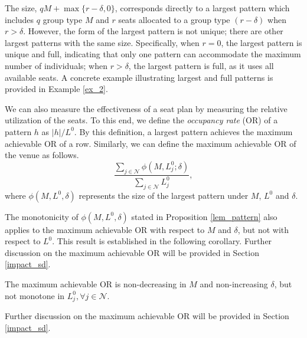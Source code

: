 The size, $qM + \max\{r-\delta, 0\}$, corresponds directly to a largest pattern which includes $q$ group type $M$ and $r$ seats allocated to a group type $(r-\delta)$ when $r>\delta$. However, the form of the largest pattern is not unique; there are other largest patterns with the same size. 
Specifically, when $r = 0$, the largest pattern is unique and full, indicating that only one pattern can accommodate the maximum number of individuals; when $r > \delta$, the largest pattern is full, as it uses all available seats. A concrete example illustrating largest and full patterns is provided in Example \ref{ex_2}. 

We can also measure the effectiveness of a seat plan by measuring the relative utilization of the seats. To this end, we define the \textit{occupancy rate} (OR) of a pattern $h$ as $|h|/L^0$. By this definition, a largest pattern achieves the maximum achievable OR of a row. Similarly, we can define the maximum achievable OR of the venue as follows. 
$$\frac{\sum_{j \in \mathcal{N}}\phi(M, L_{j}^{0}; \delta)}{\sum_{j \in \mathcal{N}} L_{j}^{0}},$$
where $\phi(M, L^{0}, \delta)$ represents the size of the largest pattern under $M$, $L^{0}$ and $\delta$.

The monotonicity of $\phi(M, L^{0}, \delta)$ stated in Proposition \ref{lem_pattern} also applies to the maximum achievable OR with respect to $M$ and $\delta$, but not with respect to $L^{0}$. This result is established in the following corollary. 
Further discussion on the maximum achievable OR will be provided in Section \ref{impact_sd}.


\begin{corollary}\label{maximum_phi}
The maximum achievable OR is non-decreasing in $M$ and non-increasing $\delta$, but not monotone in $L_{j}^{0}, \forall j \in \mathcal{N}$.
\end{corollary}

 Further discussion on the maximum achievable OR will be provided in Section \ref{impact_sd}.


